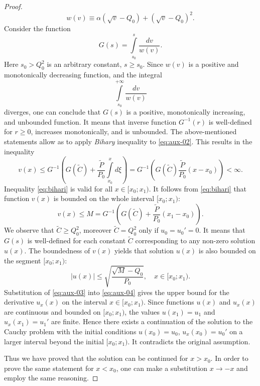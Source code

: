 \begin{proof}
\begin{equation}
		w(v) \equiv \alpha (\sqrt{v} - Q_0) + (\sqrt{v} - Q_0)^2.
	\end{equation}
	Consider the function
	\begin{equation}
		G(s) = \int \limits_{s_0}^{s} \dfrac{dv}{w(v)}.
	\end{equation}
	Here $s_0 > Q_0^2$ is an arbitrary constant, $s \ge s_0$.
	Since $w(v)$ is a positive and monotonically decreasing function, and the integral
	\begin{equation}
		\int \limits_{s_0}^{+\infty} \dfrac{dv}{w(v)}
	\end{equation}
	diverges, one can conclude that $G(s)$ is a positive, monotonically increasing, and unbounded function.
	It means that inverse function $G^{-1}(r)$ is well-defined for $r \ge 0$, increases monotonically, and is unbounded.
	The above-mentioned statements allow as to apply {\it Bihary} inequality \cite[theorem 2.3.1]{Pachpatte} to \eqref{eq:aux-02}.
	This results in the inequality
	\begin{equation}
		v(x) \le G^{-1} \left( G(\widetilde{C}) + \dfrac{\widetilde{P}}{P_0} \int \limits_{x_0}^{x} d\xi \right) = G^{-1} \left( G(\widetilde{C}) \dfrac{\widetilde{P}}{P_0} (x - x_0) \right) < \infty.
		\label{eq:bihari}
	\end{equation}
	Inequality \eqref{eq:bihari} is valid for all $x \in [x_0; x_1)$.
	It follows from \eqref{eq:bihari} that function $v(x)$ is bounded on the whole interval $[x_0; x_1)$:
	\begin{equation}
		v(x) \le M = G^{-1} \left( G(\widetilde{C}) + \dfrac{\widetilde{P}}{P_0} (x_1 - x_0) \right).
	\end{equation}
	We observe that $\widetilde{C} \ge Q_0^2$, moreover $\widetilde{C} = Q_0^2$ only if $u_0 = u_0' = 0$.
	It means that $G(s)$ is well-defined for each constant $\widetilde{C}$ corresponding to any non-zero solution $u(x)$.
	The boundedness of $v(x)$ yields that solution $u(x)$ is also bounded on the segment $[x_0; x_1)$:
	\begin{equation}
		|u(x)| \le \sqrt{\dfrac{\sqrt{M} - Q_0}{P_0}}, \quad x \in [x_0; x_1).
		\label{eq:aux-03}
	\end{equation}
	Substitution of \eqref{eq:aux-03} into \eqref{eq:aux-04} gives the upper bound for the derivative $u_{x}(x)$ on the interval $x \in [x_0; x_1)$.
	Since functions $u(x)$ and $u_{x}(x)$ are continuous and bounded on $[x_0; x_1)$, the values $u(x_1) = u_1$ and $u_{x}(x_1) = u_1'$ are finite.
	Hence there exists a continuation of the solution to the Cauchy problem with the initial conditions $u(x_0) = u_0$, $u_{x}(x_0) = u_0'$ on a larger interval beyond the initial $[x_0; x_1)$.
	It contradicts the original assumption.
	
	Thus we have proved that the solution can be continued for $x > x_0$.
	In order to prove the same statement for $x < x_0$, one can make a substitution $x \to -x$ and employ the same reasoning.
\end{proof}


